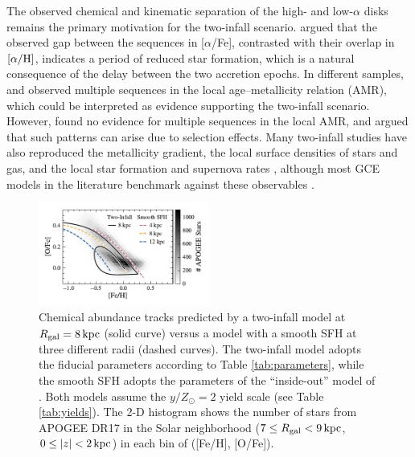 \documentclass[twocolumn,twocolappendix,linenumbers]{aastex631}
\newcommand{\todo}[1]{{\color{red}#1}}
\newcommand{\aFe}{[$\alpha$/Fe]\xspace}
\newcommand{\yZ}[1]{$y/Z_\odot=#1$}
\newcommand{\kpc}{\,{\rm kpc}}
\begin{document}
The observed chemical and kinematic separation of the high- and low-$\alpha$ disks remains the primary motivation for the two-infall scenario. \citet{spitoni_remind_2024} argued that the observed gap between the sequences in \aFe, contrasted with their overlap in $[\alpha/{\rm H}]$, indicates a period of reduced star formation, which is a natural consequence of the delay between the two accretion epochs. In different samples, \citet{nissen_high-precision_2020} and \citet{nataf_accurate_2024} observed multiple sequences in the local age--metallicity relation (AMR), which could be interpreted as evidence supporting the two-infall scenario. However, \citet{plotnikova_chemical_2024} found no evidence for multiple sequences in the local AMR, and argued that such patterns can arise due to selection effects. Many two-infall studies have also reproduced the metallicity gradient, the local surface densities of stars and gas, and the local star formation and supernova rates \citep[e.g.,][]{chiappini_chemical_1997,romano_mass_2000,spitoni_remind_2024}, although most GCE models in the literature benchmark against these observables \citep[e.g.,][]{minchev_chemodynamical_2013,johnson_stellar_2021}.

\begin{figure}
    \centering
    \includegraphics[width=0.5\textwidth]{figures/smooth_vs_twoinfall.pdf}
    \caption{Chemical abundance tracks predicted by a two-infall model at $R_{\rm gal}=8\kpc$ (solid curve) versus a model with a smooth SFH at three different radii (dashed curves). The two-infall model adopts the fiducial parameters according to Table \ref{tab:parameters}, while the smooth SFH adopts the parameters of the ``inside-out'' model of \citet{johnson_stellar_2021}. Both models assume the \yZ{2} yield scale (see Table \ref{tab:yields}). The 2-D histogram shows the number of stars from APOGEE DR17 in the Solar neighborhood ($7\leq R_{\rm gal}<9\kpc$, $0\leq|z|<2\kpc$) in each bin of ([Fe/H], [O/Fe]).}
    \label{fig:smooth-vs-twoinfall}
\end{figure}
\end{document}
